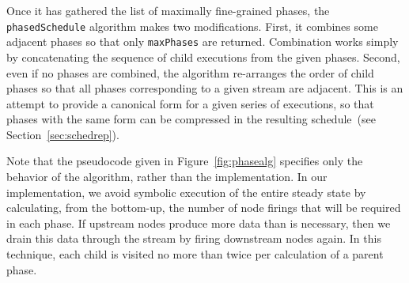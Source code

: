 Once it has gathered the list of maximally fine-grained phases, the
{\tt phasedSchedule} algorithm makes two modifications.  First, it
combines some adjacent phases so that only {\tt maxPhases} are
returned.  Combination works simply by concatenating the sequence of
child executions from the given phases.  Second, even if no phases are
combined, the algorithm re-arranges the order of child phases so that
all phases corresponding to a given stream are adjacent.  This is an
attempt to provide a canonical form for a given series of executions,
so that phases with the same form can be compressed in the resulting
schedule~(see Section~\ref{sec:schedrep}).

Note that the pseudocode given in Figure~\ref{fig:phasealg} specifies only
the behavior of the algorithm, rather than the implementation.  In our
implementation, we avoid symbolic execution of the entire steady state
by calculating, from the bottom-up, the number of node firings that
will be required in each phase.  If upstream nodes produce more data
than is necessary, then we drain this data through the stream by
firing downstream nodes again.  In this technique, each child is
visited no more than twice per calculation of a parent phase.

